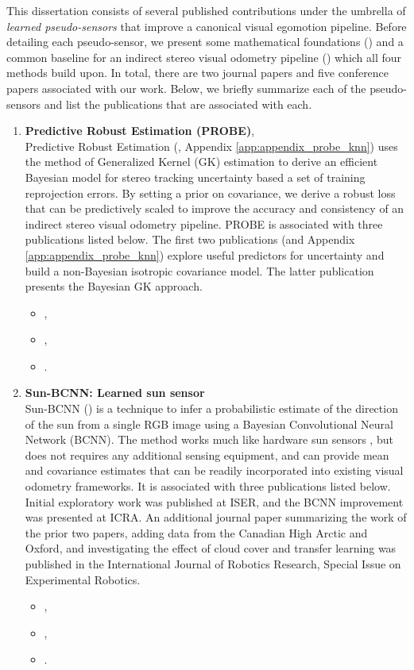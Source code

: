 This dissertation consists of several published contributions under the umbrella of \textit{learned pseudo-sensors} that improve a canonical visual egomotion pipeline. Before detailing each pseudo-sensor, we present some mathematical foundations () and a common baseline for an indirect stereo visual odometry pipeline () which all four methods build upon. In total, there are two journal papers and five conference papers associated with our work. Below, we briefly summarize each of the pseudo-sensors and list the publications that are associated with each.
\begin{enumerate}
\item \textbf{Predictive Robust Estimation (PROBE)},  \\
Predictive Robust Estimation (, Appendix \ref{app:appendix_probe_knn}) uses the method of Generalized Kernel (GK) estimation \citep{Vega-Brown2014-sb} to derive an efficient Bayesian model for stereo tracking uncertainty based a set of training reprojection errors. By setting a prior on covariance, we derive a robust loss that can be predictively scaled to improve the accuracy and consistency of an indirect stereo visual odometry pipeline. PROBE is associated with three publications listed below. The first two publications (and Appendix \ref{app:appendix_probe_knn}) explore useful predictors for uncertainty and build a non-Bayesian isotropic covariance model. The latter publication presents the Bayesian GK approach.
\begin{itemize}
\item {},
\item {},
\item {}.
\end{itemize}

\item \textbf{Sun-BCNN: Learned sun sensor} \\ 
Sun-BCNN () is a technique to infer a probabilistic estimate of the direction of the sun from a single RGB image using a Bayesian Convolutional Neural Network (BCNN). The method works much like hardware sun sensors \citep{Lambert2012-sn}, but does not requires any additional sensing equipment, and can provide mean and covariance estimates that can be readily incorporated into existing visual odometry frameworks.  It is associated with three publications listed below. Initial exploratory work was published at ISER, and the BCNN improvement was presented at ICRA. An additional journal paper summarizing the work of the prior two papers, adding data from the Canadian High Arctic and Oxford, and investigating the effect of cloud cover and transfer learning was published in the International Journal of Robotics Research, Special Issue on Experimental Robotics. 
\begin{itemize}
\item {},
\item {},
\item {}.
\end{itemize}


\end{enumerate}
